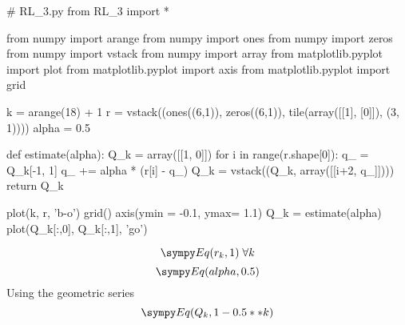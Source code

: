 
\begin{sympycode}
# RL_3.py
from RL_3 import *
\end{sympycode}

\begin{pylabcode}
from numpy import arange
from numpy import ones
from numpy import zeros
from numpy import vstack
from numpy import array
from matplotlib.pyplot import plot
from matplotlib.pyplot import axis
from matplotlib.pyplot import grid

k = arange(18) + 1
r = vstack((ones((6,1)), zeros((6,1)), tile(array([[1], [0]]), (3, 1))))
alpha = 0.5

def estimate(alpha):
	Q_k = array([[1, 0]])
	for i in range(r.shape[0]):
		q_ =  Q_k[-1, 1] 
		q_ += alpha * (r[i] - q_)	
		Q_k = vstack((Q_k, array([[i+2, q_]])))
	return Q_k

plot(k, r, 'b-o')
grid()
axis(ymin = -0.1, ymax= 1.1)
Q_k = estimate(alpha)
plot(Q_k[:,0], Q_k[:,1], 'go')
\end{pylabcode}

$$\s{Eq(r_k, 1)} \; \forall k$$
$$\s{Eq(alpha, 0.5)}$$ 
Using the geometric series
$$\s{Eq(Q_k, 1 - 0.5**k)}$$


